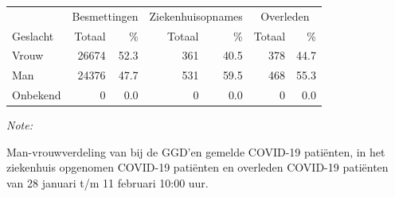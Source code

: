 \documentclass[
  english,
  man,floatsintext]{apa6}
\begin{document}
\begin{table}[H]
\centering\begingroup\fontsize{11}{13}\selectfont

\begin{threeparttable}
\begin{tabular}{lrrrrrr}
\toprule
\multicolumn{1}{c}{ } & \multicolumn{2}{c}{Besmettingen} & \multicolumn{2}{c}{Ziekenhuisopnames} & \multicolumn{2}{c}{Overleden} \\
\cmidrule(l{3pt}r{3pt}){2-3} \cmidrule(l{3pt}r{3pt}){4-5} \cmidrule(l{3pt}r{3pt}){6-7}
Geslacht & Totaal & \% & Totaal & \% & Totaal & \%\\
\midrule
Vrouw & 26674 & 52.3 & 361 & 40.5 & 378 & 44.7\\
Man & 24376 & 47.7 & 531 & 59.5 & 468 & 55.3\\
Onbekend & 0 & 0.0 & 0 & 0.0 & 0 & 0.0\\
\bottomrule
\end{tabular}
\begin{tablenotes}
\item \textit{Note: } 
\item Man-vrouwverdeling van bij de GGD’en gemelde COVID-19 patiënten, in het ziekenhuis opgenomen COVID-19 patiënten en overleden COVID-19 patiënten van 28 januari t/m 11 februari 10:00 uur.
\end{tablenotes}
\end{threeparttable}
\endgroup{}
\end{table}
\newpage
\end{document}
